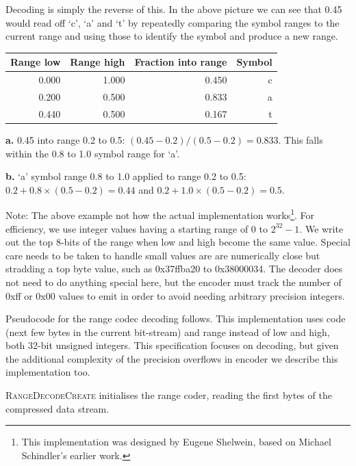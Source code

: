 \documentclass[a4paper]{article}
\begin{document}
Decoding is simply the reverse of this.  In the above picture we can see that 0.45 would read off `c', `a' and `t' by repeatedly comparing the symbol ranges to the current range and using those to identify the symbol and produce a new range.

\begin{threeparttable}[t]
\begin{tabular}{rrrr}
\hline
\textbf{Range low} & \textbf{Range high} & \textbf{Fraction into range} & \textbf{Symbol}\\
\hline
0.000 & 1.000 & 0.450 & c\\
0.200 & 0.500 & 0.833\tnote{\textbf{a}} & a\\
0.440\tnote{\textbf{b}} & 0.500 & 0.167 & t\\
\hline
\end{tabular}
\begin{tablenotes}
\item{\textbf{a.}} 0.45 into range 0.2 to 0.5: $(0.45-0.2)/(0.5-0.2) = 0.833$.
This falls within the 0.8 to 1.0 symbol range for `a'.
\item{\textbf{b.}} `a' symbol range 0.8 to 1.0 applied to range 0.2 to 0.5:  $0.2+0.8\times(0.5-0.2) = 0.44$ and $0.2+1.0\times(0.5-0.2) = 0.5$.
\end{tablenotes}
\end{threeparttable}

Note: The above example not how the actual implementation works\footnote{This implementation was designed by Eugene Shelwein, based on Michael Schindler's earlier work.}.
For efficiency, we use integer values having a starting range of 0 to $2^{32}-1$.
We write out the top 8-bits of the range when low and high become the same value.
Special care needs to be taken to handle small values are are numerically close but stradding a top byte value, such as 0x37ffba20 to 0x38000034.
The decoder does not need to do anything special here, but the encoder must track the number of 0xff or 0x00 values to emit in order to avoid needing arbitrary precision integers.

Pseudocode for the range codec decoding follows.
This implementation uses code (next few bytes in the current bit-stream) and range instead of low and high, both 32-bit unsigned integers.
This specification focuses on decoding, but given the additional complexity of the precision overflows in encoder we describe this implementation too.

\textsc{RangeDecodeCreate} initialises the range coder, reading the first bytes of the compressed data stream.
\end{document}
